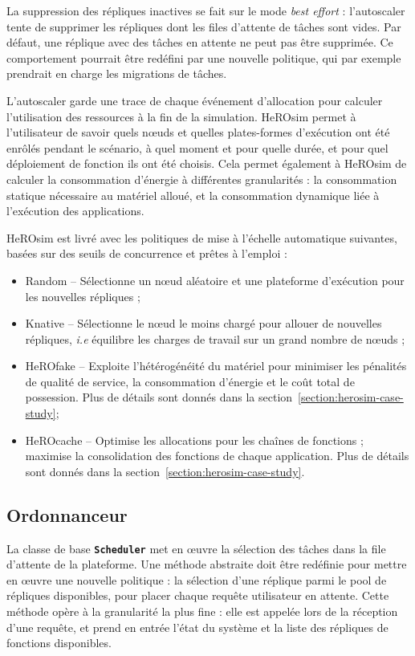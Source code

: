 La suppression des répliques inactives se fait sur le mode \textit{best effort} : l'autoscaler tente de supprimer les répliques dont les files d'attente de tâches sont vides. Par défaut, une réplique avec des tâches en attente ne peut pas être supprimée. Ce comportement pourrait être redéfini par une nouvelle politique, qui par exemple prendrait en charge les migrations de tâches.

L'autoscaler garde une trace de chaque événement d'allocation pour calculer l'utilisation des ressources à la fin de la simulation. HeROsim permet à l'utilisateur de savoir quels nœuds et quelles plates-formes d'exécution ont été enrôlés pendant le scénario, à quel moment et pour quelle durée, et pour quel déploiement de fonction ils ont été choisis. Cela permet également à HeROsim de calculer la consommation d'énergie à différentes granularités : la consommation statique nécessaire au matériel alloué, et la consommation dynamique liée à l'exécution des applications.

HeROsim est livré avec les politiques de mise à l'échelle automatique suivantes, basées sur des seuils de concurrence et prêtes à l'emploi :

\begin{itemize}
    \item Random -- Sélectionne un nœud aléatoire et une plateforme d'exécution pour les nouvelles répliques ;
    \item Knative -- Sélectionne le nœud le moins chargé pour allouer de nouvelles répliques, \textit{i.e} équilibre les charges de travail sur un grand nombre de nœuds ;
    \item HeROfake -- Exploite l'hétérogénéité du matériel pour minimiser les pénalités de qualité de service, la consommation d'énergie et le coût total de possession. Plus de détails sont donnés dans la section~\ref{section:herosim-case-study};
    \item HeROcache -- Optimise les allocations pour les chaînes de fonctions ; maximise la consolidation des fonctions de chaque application. Plus de détails sont donnés dans la section~\ref{section:herosim-case-study}.
\end{itemize}

\subsection{Ordonnanceur}

La classe de base \textbf{\texttt{Scheduler}} met en œuvre la sélection des tâches dans la file d'attente de la plateforme. Une méthode abstraite doit être redéfinie pour mettre en œuvre une nouvelle politique : la sélection d'une réplique parmi le pool de répliques disponibles, pour placer chaque requête utilisateur en attente. Cette méthode opère à la granularité la plus fine : elle est appelée lors de la réception d'une requête, et prend en entrée l'état du système et la liste des répliques de fonctions disponibles.

